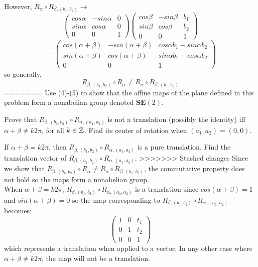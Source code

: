 \documentclass[12pt]{article}
\begin{document}
However, $R_\alpha \circ R_{\beta,(b_1,b_2)}\rightarrow$
$$\begin{pmatrix}
cos\alpha & -sin\alpha & 0\\ sin\alpha & cos\alpha & 0 \\ 0&0&1
\end{pmatrix}\begin{pmatrix}
cos\beta & -sin\beta & b_1\\ sin\beta & cos\beta & b_2 \\ 0&0&1
\end{pmatrix}$$
$$=
\begin{pmatrix}
cos(\alpha + \beta)& -sin(\alpha + \beta) & cos\alpha b_1 - sin\alpha b_2\\
sin(\alpha + \beta) & cos(\alpha + \beta) &sin\alpha b_1 + cos\alpha b_2 \\
0&0&1
\end{pmatrix}$$
 so generally, $$R_{\beta,(b_1,b_2)} \circ R_{\alpha} \ne R_\alpha \circ R_{\beta,(b_1,b_2)}$$ 
=======
Use (4)-(5) to show that the affine maps of the plane defined in this
problem form a nonabelian group denoted $\mathbf{SE}(2)$.

\medskip
Prove that  $R_{\beta, (b_1,b_2)} \circ R_{\alpha, (a_1,a_2)}$ is
not a translation (possibly the identity)  iff
$\alpha + \beta \not= k 2\pi$, for all  $k\in \mathbb{Z}$.
Find its center of rotation when $(a_1, a_2) = (0, 0)$.  

\medskip
If $\alpha + \beta = k 2\pi$, then  $R_{\beta, (b_1,b_2)} \circ
R_{\alpha, (a_1,a_2)}$
is a pure translation. 
Find the translation vector 
of $R_{\beta, (b_1,b_2)} \circ R_{\alpha, (a_1,a_2)}$.
>>>>>>> Stashed changes
Since we show that $R_{\beta,(b_1,b_2)} \circ R_{\alpha} \ne R_{\alpha} \circ R_{\beta,(b_1,b_2)}$, the commutative property does not hold so the maps form a nonabelian group.\\

When $\alpha + \beta = k2\pi$, $R_{\beta,(b_1,b_2)} \circ R_{\alpha,(a_1,a_2)}$ is a translation since $cos(\alpha + \beta)= 1$ and $sin(\alpha + \beta)=0$ so the map corresponding to $R_{\beta,(b_1,b_2)} \circ R_{\alpha,(a_1,a_2)}$ becomes:
$$\begin{pmatrix} 1 & 0 & t_1\\0&1& t_2\\0&0&1\end{pmatrix}$$ which represents a translation when applied to a vector. In any other case where $\alpha + \beta \ne k2\pi$, the map will not be a translation.\\
\end{document}
